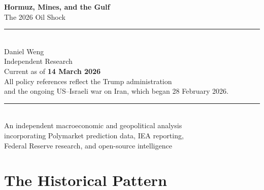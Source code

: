 \documentclass[12pt,a4paper]{article}
\begin{document}
 
\begin{titlepage}
  \begin{center}
    \vspace*{3cm}
 
    {\fontsize{26}{32}\selectfont\bfseries\color{heading}
      Hormuz, Mines, and the Gulf}\\[1.2em]
 
    {\large\color{subtext}
      The 2026 Oil Shock}\\[2.5em]
 
    {\color{ruleline}\rule{0.5\textwidth}{0.4pt}}\\[2em]
 
    {\normalsize Daniel Weng}\\[0.4em]
    {\small\color{subtext} Independent Research}\\[3em]
 
    {\small Current as of \textbf{14 March 2026}}\\[0.3em]
    {\footnotesize\color{subtext}
      All policy references reflect the Trump administration\\
      and the ongoing US--Israeli war on Iran, which began 28 February 2026.}\\[3em]
 
    {\color{ruleline}\rule{0.5\textwidth}{0.3pt}}\\[1.5em]
 
    {\footnotesize\color{subtext}
      An independent macroeconomic and geopolitical analysis\\
      incorporating Polymarket prediction data, IEA reporting,\\
      Federal Reserve research, and open-source intelligence}
 
  \end{center}
 
  \vfill
 
 
\end{titlepage}
 
\tableofcontents
\newpage


\section{The Historical Pattern}
\end{document}
